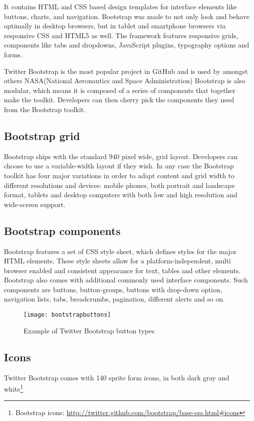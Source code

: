 It contains HTML and CSS based design templates for interface elements like buttons, charts, and navigation. Bootstrap was made to not only look and behave optimally in desktop browsers, but in tablet and smartphone browsers via responsive CSS and HTML5 as well. The framework features responsive grids, components like tabs and dropdowns, JavaScript plugins, typography options and forms. 

Twitter Bootstrap is the most popular project in GitHub and is used by amongst others NASA(National Aeronautics and Space Administration)\citep{nasa}
Bootstrap is also modular, which means it is composed of a series of components that together make the toolkit. Developers can then cherry pick the components they need from the Bootstrap toolkit. 


\subsection{Bootstrap grid}
Bootstrap ships with the standard 940 pixel wide, grid layout. Developers can choose to use a variable-width layout if they wish. In any case the Bootstrap toolkit has four major variations in order to adapt content and grid width to different resolutions and devices: mobile phones, both portrait and landscape format, tablets and desktop computers with both low and high resolution and wide-screen support.

\subsection{Bootstrap components}
Bootstrap features a set of CSS style sheet, which defines styles for the major HTML elements. These style sheets allow for a platform-independent, multi browser enabled and consistent appearance for text, tables and other elements. \\
Bootstrap also comes with additional commonly used interface components. Such components are buttons, button-groups, buttons with drop-down option, navigation lists, tabs, breadcrumbs, pagination, different alerts and so on. 
\begin{figure}[H]
\centering
	\texttt{[image: bootstrapbuttons]}
\caption{Example of Twitter Bootstrap button types \citep{twitterbootstrap}}
\label{bootstrapbutton}
\end{figure}

\subsection{Icons}
Twitter Bootstrap comes with 140 sprite form icons, in both dark gray and white\footnote{Bootstrap icons: \url{http://twitter.github.com/bootstrap/base-css.html\#icons}} 

